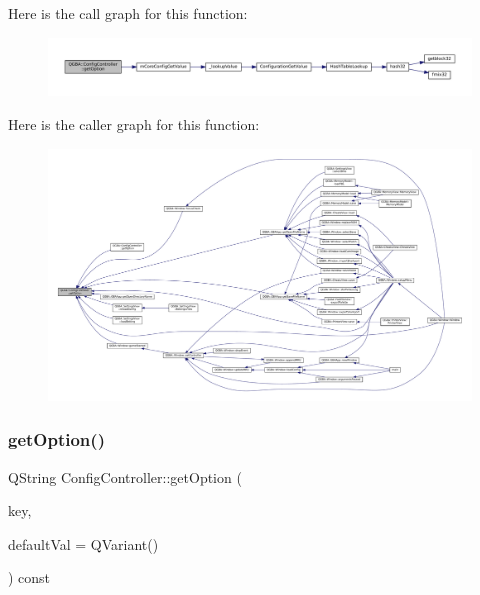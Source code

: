 Here is the call graph for this function\+:
\nopagebreak
\begin{figure}[H]
\begin{center}
\leavevmode
\includegraphics[width=350pt]{class_q_g_b_a_1_1_config_controller_a9c0190d19267446ec9959084664fb1a2_cgraph}
\end{center}
\end{figure}
Here is the caller graph for this function\+:
\nopagebreak
\begin{figure}[H]
\begin{center}
\leavevmode
\includegraphics[width=350pt]{class_q_g_b_a_1_1_config_controller_a9c0190d19267446ec9959084664fb1a2_icgraph}
\end{center}
\end{figure}
\mbox{\label{class_q_g_b_a_1_1_config_controller_a896df6163b258ee10856c3c7c5272fd7}} 
\subsubsection{\texorpdfstring{get\+Option()}{getOption()}\hspace{0.1cm}{\footnotesize\ttfamily [2/2]}}
{\footnotesize\ttfamily Q\+String Config\+Controller\+::get\+Option (\begin{DoxyParamCaption}\item[{const Q\+String \&}]{key,  }\item[{const Q\+Variant \&}]{default\+Val = {\ttfamily QVariant()} }\end{DoxyParamCaption}) const}

